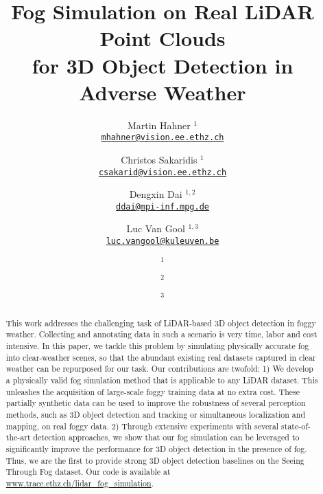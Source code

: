 \documentclass[10pt,twocolumn,letterpaper]{article}
\begin{document}
\title{\vspace{-0.4cm}Fog Simulation on Real LiDAR Point Clouds \\ for 3D Object Detection in Adverse Weather}

\author{Martin Hahner $^1$\\
{\tt\scriptsize \href{mailto:mhahner@vision.ee.ethz.ch}{mhahner@vision.ee.ethz.ch}}
\and
Christos Sakaridis $^1$\\
{\tt\scriptsize \href{mailto:csakarid@vision.ee.ethz.ch}{csakarid@vision.ee.ethz.ch}}
\and
Dengxin Dai $^{1,2}$\\
{\tt\scriptsize \href{mailto:ddai@mpi-inf.mpg.de}{ddai@mpi-inf.mpg.de}}
\and
Luc Van Gool $^{1,3}$\\
{\tt\scriptsize \href{mailto:luc.vangool@kuleuven.be}{luc.vangool@kuleuven.be}}
\and
$^{1}$ 
\and
$^{2}$ 
\and
$^{3}$ 
}

\maketitle
%
 
\begin{abstract}
   This work addresses the challenging task of LiDAR-based 3D object detection in foggy weather. 
   Collecting and annotating data in such a scenario is very time, labor and cost intensive. 
   In this paper, we tackle this problem by simulating physically accurate fog into clear-weather scenes, so that the abundant existing real datasets captured in clear weather can be repurposed for our task. 
   Our contributions are twofold:
   1) We develop a physically valid fog simulation method that is applicable to any LiDAR dataset. This unleashes the acquisition of large-scale foggy training data at no extra cost. These partially synthetic data can be used to improve the robustness of several perception methods, such as 3D object detection and tracking or simultaneous localization and mapping, on real foggy data.
   2) Through extensive experiments with several state-of-the-art detection approaches, we show that our fog simulation can be leveraged to significantly improve the performance for 3D object detection in the presence of fog. Thus, we are the first to provide strong 3D object detection baselines on the Seeing Through Fog dataset. Our code is available at \href{https://trace.ethz.ch/lidar_fog_simulation}{www.trace.ethz.ch/lidar\_fog\_simulation}.
\end{abstract}
\end{document}
